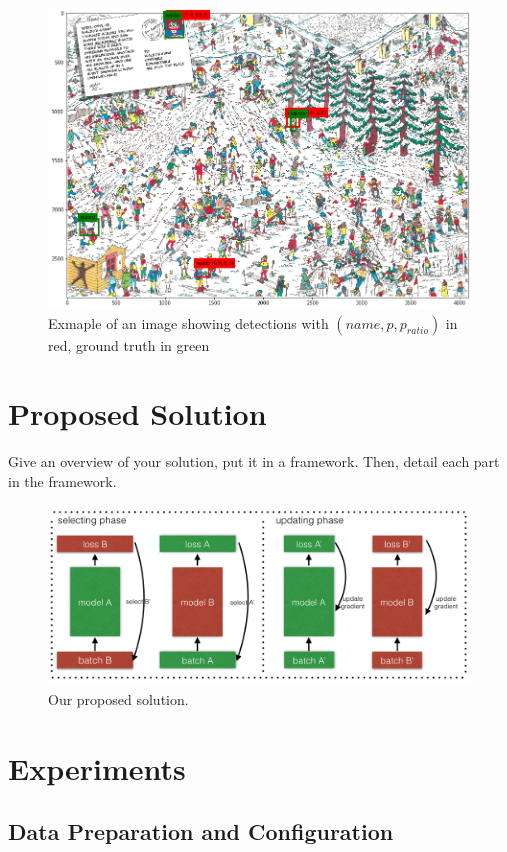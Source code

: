 \documentclass[11pt]{article}
\begin{document}
\begin{figure}
    \centering
    \includegraphics[width=0.9\linewidth]{figures/waldo_winter} 
    \caption{Exmaple of an image showing detections with \( (name, p, p_{ratio}) \) in red, ground truth in green}
    \label{fig:waldo-winter}
\end{figure}

\section{Proposed Solution}
Give an overview of your solution, put it in a framework. Then, detail each part in the framework.

\begin{figure}[ht]
\centering
    \includegraphics[width=14cm]{figures/coteaching.png}
    \caption{Our proposed solution.}
    \label{fig:framework}
\end{figure}


\section{Experiments}
\subsection{Data Preparation and Configuration}\label{subsec:data-prep}
\end{document}
